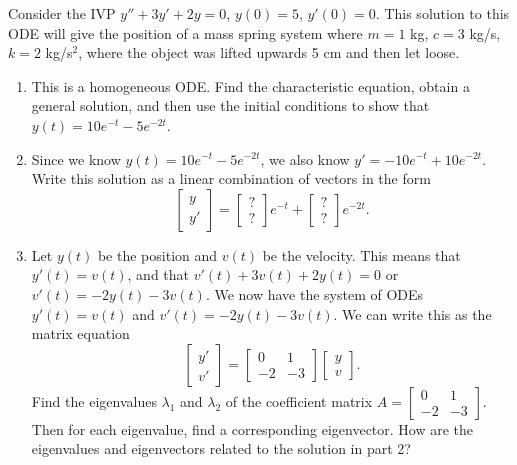 \begin{problem}
 Consider the IVP $y''+3y'+2y=0$, $y(0)=5$, $y'(0)=0$. This solution to this ODE will give the position of a mass spring system where $m=1$ kg, $c=3$ kg/s, $k=2$ kg/s$^2$, where the object was lifted upwards 5 cm and then let loose. 
\begin{enumerate}
\item This is a homogeneous ODE. Find the characteristic equation, obtain a general solution, and then use the initial conditions to show that $y(t) = 10 e^{-t}-5 e^{-2 t}$. 
 \item Since we know $y(t) = 10 e^{-t}-5 e^{-2 t}$, we also know $y' = -10 e^{-t}+10 e^{-2 t}$. Write this solution as a linear combination of vectors in the form 
$$
\begin{bmatrix}
y\\y'
\end{bmatrix}
=
\begin{bmatrix}
?\\?
\end{bmatrix}
e^{-t}+
\begin{bmatrix}
?\\?
\end{bmatrix}
e^{-2t}
.$$
\item Let $y(t)$ be the position and $v(t)$ be the velocity. This means that $y'(t)=v(t)$, and that $v'(t)+3v(t)+2y(t)=0$ or $v'(t)=-2y(t)-3v(t)$. We now have the system of ODEs $y'(t)=v(t)$ and $v'(t)=-2y(t)-3v(t)$.  
We can write this as the matrix equation
$$
\begin{bmatrix}
y'\\v'
\end{bmatrix}
=\begin{bmatrix}
0&1\\-2&-3
\end{bmatrix}
\begin{bmatrix}
y\\v
\end{bmatrix}.
$$
 Find the eigenvalues $\lambda_1$ and $\lambda_2$ of the coefficient matrix 
$A=
\begin{bmatrix}
0&1\\-2&-3
\end{bmatrix}
.$ 
Then for each eigenvalue, find a corresponding eigenvector. How are the eigenvalues and eigenvectors related to the solution in part 2?
\end{enumerate}
\end{problem}



